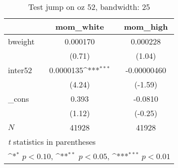 \begin{table}[htbp]\centering
\def\sym#1{\ifmmode^{#1}\else\(^{#1}\)\fi}
\caption{Test jump on oz 52, bandwidth: 25}
\begin{tabular}{l*{2}{c}}
\hline\hline
            &\multicolumn{1}{c}{mom\_white}&\multicolumn{1}{c}{mom\_high}\\
\hline
bweight     &    0.000170         &    0.000228         \\
            &      (0.71)         &      (1.04)         \\
[1em]
inter52     &   0.0000135\sym{***}& -0.00000460         \\
            &      (4.24)         &     (-1.59)         \\
[1em]
\_cons      &       0.393         &     -0.0810         \\
            &      (1.12)         &     (-0.25)         \\
\hline
\(N\)       &       41928         &       41928         \\
\hline\hline
\multicolumn{3}{l}{\footnotesize \textit{t} statistics in parentheses}\\
\multicolumn{3}{l}{\footnotesize \sym{*} \(p<0.10\), \sym{**} \(p<0.05\), \sym{***} \(p<0.01\)}\\
\end{tabular}
\end{table}
